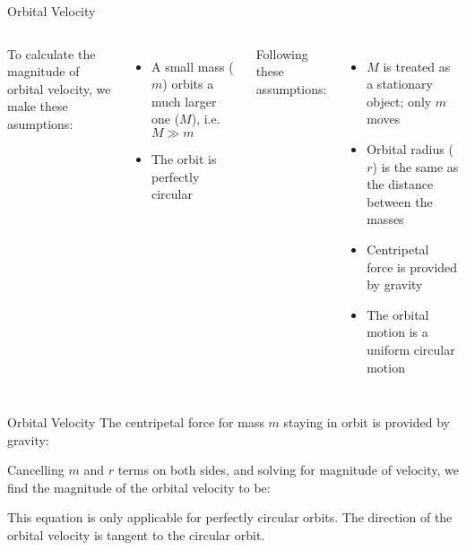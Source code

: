 \documentclass[12pt,compress,aspectratio=169]{beamer}
\begin{document}
\begin{frame}{Orbital Velocity}
  \begin{columns}
    
    To calculate the magnitude of orbital velocity, we make these asumptions:
    \begin{itemize}
    \item A small mass ($m$) orbits a much larger one ($M$), i.e.\ $M\gg m$
    \item The orbit is perfectly circular
    \end{itemize}
    Following these assumptions:
    \begin{itemize}
    \item $M$ is treated as a stationary object; only $m$ moves
    \item Orbital radius ($r$) is the same as the distance between the masses
    \item Centripetal force is provided by gravity
    \item The orbital motion is a uniform circular motion
    \end{itemize}
  \end{columns}
\end{frame}



\begin{frame}{Orbital Velocity}
  The centripetal force for mass $m$ staying in orbit is provided by gravity:


  \vspace{-.05in}Cancelling $m$ and $r$ terms on both sides, and solving for
  magnitude of velocity, we find the magnitude of the orbital velocity to be:


  This equation is only applicable for perfectly circular orbits.
  The direction of the orbital velocity is tangent to the circular orbit.
\end{frame}
\end{document}

